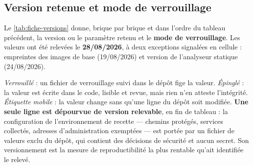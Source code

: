 \subsection{Version retenue et mode de verrouillage}
\label{ann:versions-detail}

Le \cref{tab:fiche-versions} donne, brique par brique et dans l'ordre du tableau précédent, la
version ou le paramètre retenu et le \textbf{mode de verrouillage}. Les valeurs ont été relevées le \textbf{28/08/2026}, à deux exceptions signalées en
cellule : empreintes des images de base (19/08/2026) et version de l'analyseur statique
(24/08/2026).

\emph{Verrouillé} : un
fichier de verrouillage suivi dans le dépôt fige la valeur. \emph{Épinglé} : la valeur est écrite
dans le code, lisible et revue, mais rien n'en atteste l'intégrité. \emph{Étiquette mobile} : la
valeur change sans qu'une ligne du dépôt soit modifiée. \textbf{Une seule ligne est dépourvue de
version relevable}, en fin de tableau : la configuration de l'environnement de recette --- chemins
protégés, services collectés, adresses d'administration exemptées --- est portée par un fichier de
valeurs exclu du dépôt, qui contient des décisions de sécurité et aucun secret. Son versionnement
est la mesure de reproductibilité la plus rentable qu'ait identifiée le relevé.


